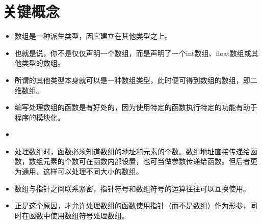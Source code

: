 \section{关键概念}
\begin{frame}[fragile]\ft{\secname}
\begin{itemize}
\item
数组是一种派生类型，因它建立在其他类型之上。\\[0.1in]
\item
也就是说，你不是仅仅声明一个数组，而是声明了一个int数组、float数组或其他类型的数组。\\[0.1in]
\item
所谓的其他类型本身就可以是一种数组类型，此时便可得到数组的数组，即二维数组。
\end{itemize}
\end{frame}

\begin{frame}[fragile]\ft{\secname}
\begin{itemize}
\item
编写处理数组的函数是有好处的，因为使用特定的函数执行特定的功能有助于程序的模块化。\\[0.1in]
\item
{}\\[0.1in]
\item
处理数组时，函数必须知道数组的地址和元素的个数。数组地址直接传递给函数，数组元素的个数可在函数内部设置，也可当做参数传递给函数。但后者更为通用，这样可以处理不同大小的数组。
\end{itemize}
\end{frame}

\begin{frame}[fragile]\ft{\secname}
\begin{itemize}
\item 数组与指针之间联系紧密，指针符号和数组符号的运算往往可以互换使用。\\[0.1in]
\item 正是这个原因，才允许处理数组的函数使用指针（而不是数组）作为形参，同时在函数中使用数组符号处理数组。
\end{itemize}
\end{frame}
